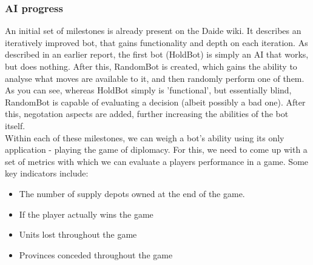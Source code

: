 \documentclass[11pt]{article}
\begin{document}
\subsubsection{AI progress}
An initial set of milestones is already present on the Daide wiki. It describes 
an iteratively improved bot, that gains functionality and depth on each iteration.
As described in an earlier report, the first bot (HoldBot) is simply an AI that
works, but does nothing. After this, RandomBot is created, which gains the
ability to analyse what moves are available to it, and then randomly perform one
of them. As you can see, whereas HoldBot simply is 'functional', but essentially
blind, RandomBot is capable of evaluating a decision (albeit possibly a bad one).
After this, negotation aspects are added, further increasing the abilities of
the bot itself. 
\\
Within each of these milestones, we can weigh a bot's ability using its only 
application - playing the game of diplomacy. For this, we need to come up with
a set of metrics with which we can evaluate a players performance in a game.
Some key indicators include:

\begin{itemize}
\item The number of supply depots owned at the end of the game.
\item If the player actually wins the game
\item Units lost throughout the game
\item Provinces conceded throughout the game
\end{itemize}
\end{document}
